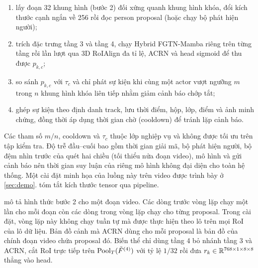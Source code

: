 \begin{enumerate}
  \item lấy đoạn 32 khung hình (bước 2) đối xứng quanh khung hình khóa, đổi kích thước cạnh ngắn về 256 rồi đọc person proposal (hoặc chạy bộ phát hiện người);
  \item trích đặc trưng tầng 3 và tầng 4, chạy Hybrid FGTN-Mamba riêng trên từng tầng rồi lần lượt qua 3D RoIAlign đa tỉ lệ, ACRN và head sigmoid để thu được $p_{k,c}$;
  \item so sánh $p_{k,c}$ với $\tau_c$ và chỉ phát sự kiện khi cùng một actor vượt ngưỡng $m$ trong $n$ khung hình khóa liên tiếp nhằm giảm cảnh báo chớp tắt;
  \item ghép sự kiện theo định danh track, lưu thời điểm, hộp, lớp, điểm và ảnh minh chứng, đồng thời áp dụng thời gian chờ (cooldown) để tránh lặp cảnh báo.
\end{enumerate}
Các tham số $m/n$, cooldown và $\tau_c$ thuộc lớp nghiệp vụ và không được tối ưu trên tập kiểm tra. Độ trễ đầu--cuối bao gồm thời gian giải mã, bộ phát hiện người, bộ đệm nhìn trước của quét hai chiều (tối thiểu nửa đoạn video), mô hình và gửi cảnh báo nên thời gian suy luận của riêng mô hình không đại diện cho toàn hệ thống. Một cài đặt minh họa của luồng này trên video được trình bày ở \cref{sec:demo}.  tóm tắt kích thước tensor qua pipeline.

 mô tả hình thức bước 2 cho một đoạn video. Các dòng trước vòng lặp chạy một lần cho mỗi đoạn còn các dòng trong vòng lặp chạy cho từng proposal. Trong cài đặt, vòng lặp này không chạy tuần tự mà được thực hiện theo lô trên mọi RoI của lô dữ liệu. Bản đồ cảnh mà ACRN dùng cho mỗi proposal là bản đồ của chính đoạn video chứa proposal đó. Biến thể chỉ dùng tầng 4 bỏ nhánh tầng 3 và ACRN, cắt RoI trực tiếp trên $\operatorname{Pool}_T(\tilde{F}^{(4)})$ với tỷ lệ $1/32$ rồi đưa $r_k \in \mathbb{R}^{768 \times 1 \times 8 \times 8}$ thẳng vào head.

